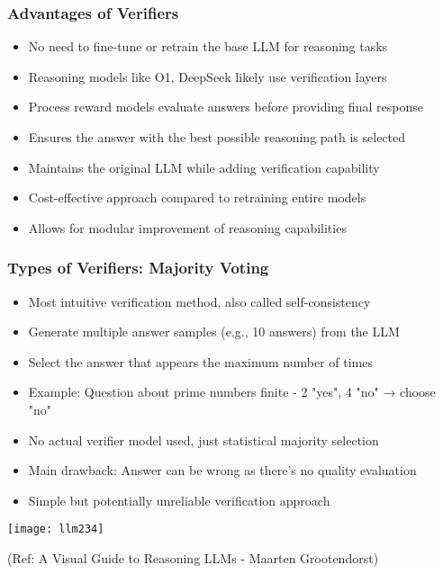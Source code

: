 \begin{frame}[fragile]\frametitle{Advantages of Verifiers}
      \begin{itemize}
        \item No need to fine-tune or retrain the base LLM for reasoning tasks
        \item Reasoning models like O1, DeepSeek likely use verification layers
        \item Process reward models evaluate answers before providing final response
        \item Ensures the answer with the best possible reasoning path is selected
        \item Maintains the original LLM while adding verification capability
        \item Cost-effective approach compared to retraining entire models
        \item Allows for modular improvement of reasoning capabilities
      \end{itemize}
\end{frame}

\begin{frame}[fragile]\frametitle{Types of Verifiers: Majority Voting}
      \begin{itemize}
        \item Most intuitive verification method, also called self-consistency
        \item Generate multiple answer samples (e.g., 10 answers) from the LLM
        \item Select the answer that appears the maximum number of times
        \item Example: Question about prime numbers finite - 2 "yes", 4 "no" → choose "no"
        \item No actual verifier model used, just statistical majority selection
        \item Main drawback: Answer can be wrong as there's no quality evaluation
        \item Simple but potentially unreliable verification approach
      \end{itemize}
	  
		

		\begin{center}
        \texttt{[image: llm234]}
		
		{\tiny (Ref: A Visual Guide to Reasoning LLMs - Maarten Grootendorst)}
		
		\end{center}		
\end{frame}


